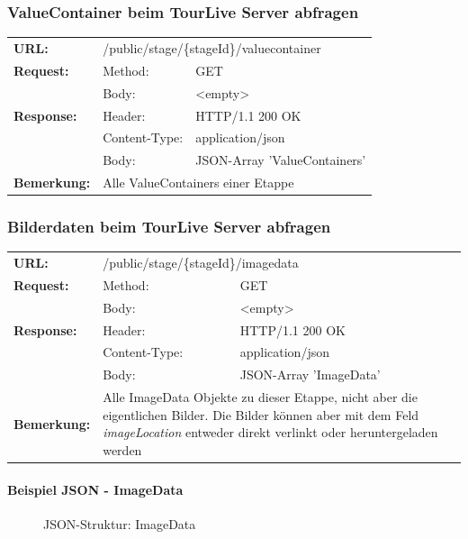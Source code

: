 \subsubsection{ValueContainer beim TourLive Server abfragen}
\begin{longtable}{ p{2.5cm} p{3.5cm} p{6cm}}
	\textbf{URL:} & \multicolumn{2}{l}{/public/stage/\{stageId\}/valuecontainer} \\
	\textbf{Request:} & Method: & GET \\
		& Body: & <empty>\\
	\textbf{Response:} &  Header: & HTTP/1.1 200 OK \\
		& Content-Type: & application/json \\
		& Body: & JSON-Array 'ValueContainers'\\
	\textbf{Bemerkung:} & \multicolumn{2}{p{10cm}}{Alle ValueContainers einer Etappe}
\end{longtable}

\subsubsection{Bilderdaten beim TourLive Server abfragen}
\begin{longtable}{ p{2.5cm} p{3.5cm} p{6cm}}
	\textbf{URL:} & \multicolumn{2}{l}{/public/stage/\{stageId\}/imagedata} \\
	\textbf{Request:} & Method: & GET \\
		& Body: & <empty>\\
	\textbf{Response:} &  Header: & HTTP/1.1 200 OK \\
		& Content-Type: & application/json \\
		& Body: & JSON-Array 'ImageData'\\
	\textbf{Bemerkung:} & \multicolumn{2}{p{10cm}}{Alle ImageData Objekte zu dieser Etappe, nicht aber die eigentlichen Bilder. Die Bilder können aber mit dem Feld \textit{imageLocation} entweder direkt verlinkt oder heruntergeladen werden}
\end{longtable}

\paragraph{Beispiel JSON - ImageData}
\begin{figure}[H]
	\centering
	
	\caption{JSON-Struktur: ImageData}
\end{figure}

